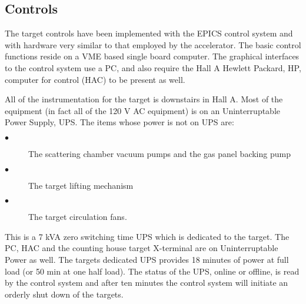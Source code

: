 \subsection{ Controls}

The target controls have been implemented with the EPICS control
system and with hardware very similar to that employed by the accelerator.
The basic control functions reside on a VME based single board
computer. The graphical interfaces to the control system use a PC, and
also require the Hall A Hewlett Packard, HP, computer for control (HAC)
to be present as well.

All of the instrumentation for the target is downstairs in Hall A.
Most of the equipment (in fact all of the 120 V AC equipment) is
on an Uninterruptable Power Supply, UPS. The items whose power
is not on UPS are:
\begin{description}
\item[$\bullet$] The scattering chamber vacuum pumps and the gas panel
backing pump
\item[$\bullet$] The target lifting mechanism
\item[$\bullet$] The target circulation fans.
\end{description}
This is a 7 kVA zero switching time
UPS which is dedicated to the target. The PC, HAC and the counting house target
X-terminal are on Uninterruptable Power as well. 
The targets dedicated UPS provides 18 minutes of power at full load
(or 50 min at one half load). The status of the UPS, online or offline,
is read by the control system and after ten minutes the control system
will initiate an orderly shut down of the targets.

